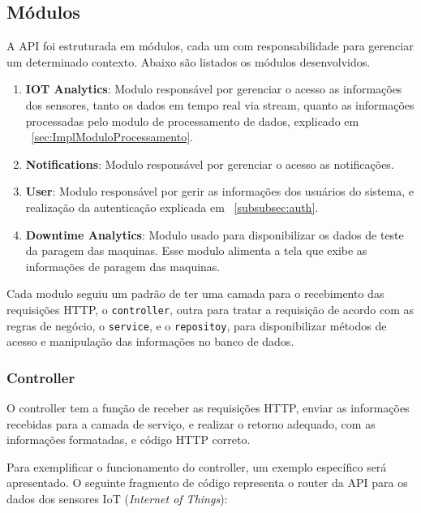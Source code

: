 \subsection{Módulos}\label{subsec:modules}
A API foi estruturada em módulos, cada um com responsabilidade para gerenciar um determinado contexto. Abaixo são listados os módulos desenvolvidos.

\begin{enumerate}
    \item \textbf{IOT Analytics}: Modulo responsável por gerenciar o acesso as informações dos sensores, tanto os dados em tempo real via stream, quanto as informações processadas pelo modulo de processamento de dados, explicado em ~\ref{sec:ImplModuloProcessamento}.
    \item \textbf{Notifications}: Modulo responsável por gerenciar o acesso as notificações.
    \item \textbf{User}: Modulo responsável por gerir as informações dos usuários do sistema, e realização da autenticação explicada em ~\ref{subsubsec:auth}.
    \item \textbf{Downtime Analytics}: Modulo usado para disponibilizar os dados de teste da paragem das maquinas. Esse modulo alimenta a tela que exibe as informações de paragem das maquinas.

\end{enumerate}


Cada modulo seguiu um padrão de ter uma camada para o recebimento  das requisições HTTP, o \texttt{controller}, outra para tratar a requisição de acordo com as regras de negócio, o \texttt{service}, e o \texttt{repositoy}, para disponibilizar métodos de acesso e manipulação das informações no banco de dados.

\subsubsection{Controller}\label{subsubsec:controller}
O controller tem a função de receber as requisições HTTP, enviar as informações recebidas para a camada de serviço, e realizar o retorno adequado, com as informações formatadas, e código HTTP correto.

Para exemplificar o funcionamento do controller, um exemplo específico será apresentado. O seguinte fragmento de código representa o router da API para os dados dos sensores IoT (\textit{Internet of Things}):

